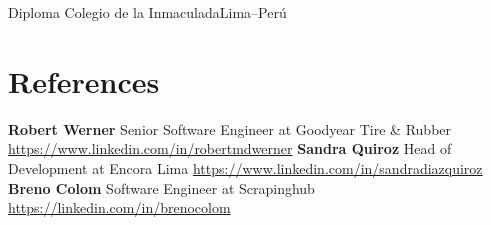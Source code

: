 \documentclass[11pt,a4paper,english]{moderncv}
\begin{document}
    {Diploma}
    {Colegio de la Inmaculada}{Lima--Perú}
    {}{}

\subsection{}

\section{References}
\cvlistitem
{
    \textbf{Robert Werner}
    \newline{}
    Senior Software Engineer at Goodyear Tire \& Rubber
    \newline{}
    \url{https://www.linkedin.com/in/robertmdwerner}
}
\cvlistitem
{
    \textbf{Sandra Quiroz}
    \newline{}
    Head of Development at Encora Lima
    \newline{}
    \url{https://www.linkedin.com/in/sandradiazquiroz}
}
\cvlistitem
{
    \textbf{Breno Colom}
    \newline{}
    Software Engineer at Scrapinghub
    \newline{}
    \url{https://linkedin.com/in/brenocolom}
}
\end{document}
